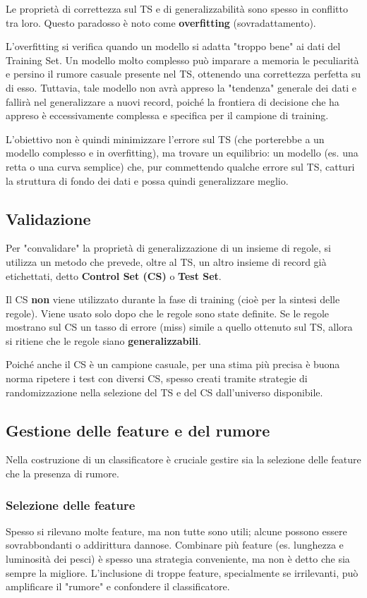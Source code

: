 Le proprietà di correttezza sul TS e di generalizzabilità sono
spesso in conflitto tra loro.
Questo paradosso è noto come \textbf{overfitting} (sovradattamento).

L'overfitting si verifica quando un modello si adatta
"troppo bene" ai dati del Training Set. Un modello molto
complesso può imparare a memoria le peculiarità e persino
il rumore casuale presente nel TS, ottenendo una correttezza
perfetta su di esso.
Tuttavia, tale modello non avrà appreso la "tendenza" generale
dei dati e fallirà nel generalizzare a nuovi record,
poiché la frontiera di decisione che ha appreso è
eccessivamente complessa e specifica per il campione di training.

L'obiettivo non è quindi minimizzare l'errore sul TS (che
porterebbe a un modello complesso e in overfitting), ma
trovare un equilibrio: un modello (es. una retta o una
curva semplice) che, pur commettendo qualche errore sul TS,
catturi la struttura di fondo dei dati e possa quindi
generalizzare meglio.

\subsection{Validazione}

Per "convalidare" la proprietà di generalizzazione di un
insieme di regole, si utilizza un metodo che prevede, oltre
al TS, un altro insieme di record già etichettati, detto
\textbf{Control Set (CS)} o \textbf{Test Set}.

Il CS \textbf{non} viene utilizzato durante la fase di
training (cioè per la sintesi delle regole). Viene usato
solo dopo che le regole sono state definite.
Se le regole mostrano sul CS un tasso di errore (miss)
simile a quello ottenuto sul TS, allora si ritiene
che le regole siano \textbf{generalizzabili}.

Poiché anche il CS è un campione casuale, per una stima
più precisa è buona norma ripetere i test con diversi CS,
spesso creati tramite strategie di randomizzazione
nella selezione del TS e del CS dall'universo disponibile.

\subsection{Gestione delle feature e del rumore}

Nella costruzione di un classificatore è cruciale gestire
sia la selezione delle feature che la presenza di rumore.

\subsubsection{Selezione delle feature}
Spesso si rilevano molte feature, ma non tutte sono utili;
alcune possono essere sovrabbondanti o addirittura dannose.
Combinare più feature (es. lunghezza e luminosità dei pesci)
è spesso una strategia conveniente, ma non è detto che
sia sempre la migliore.
L'inclusione di troppe feature, specialmente se irrilevanti,
può amplificare il "rumore" e confondere il classificatore.

